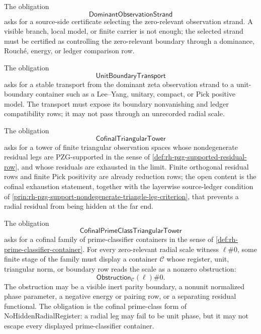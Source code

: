 \begin{definition}
\label{def:rh-dominant-observation-strand-obligation}
The obligation
$$
\mathsf{DominantObservationStrand}
$$
asks for a source-side certificate selecting the zero-relevant
observation strand. A visible branch, local model, or finite carrier is
not enough; the selected strand must be certified as controlling the
zero-relevant boundary through a dominance, Rouch\'e, energy, or ledger
comparison row.
\end{definition}

\begin{definition}
\label{def:rh-unit-boundary-transport-obligation}
The obligation
$$
\mathsf{UnitBoundaryTransport}
$$
asks for a stable transport from the dominant zeta observation strand to
a unit-boundary container such as a Lee--Yang, unitary, compact, or Pick
positive model. The transport must expose its boundary nonvanishing and
ledger compatibility rows; it may not pass through an unrecorded radial
scale.
\end{definition}

\begin{definition}
\label{def:rh-cofinal-triangular-tower-obligation}
The obligation
$$
\mathsf{CofinalTriangularTower}
$$
asks for a tower of finite triangular observation spaces whose
nondegenerate residual legs are PZG-supported in the sense of
\autoref{def:rh-pzg-supported-residual-row}, and whose residuals are
exhausted in the limit. Finite orthogonal residual rows and finite Pick
positivity are already reduction rows; the open content is the cofinal
exhaustion statement, together with the layerwise source-ledger condition
of \autoref{prin:rh-pzg-support-nondegenerate-triangle-leg-criterion},
that prevents a radial residual from being hidden at the far end.
\end{definition}

\begin{definition}
\label{def:rh-cofinal-prime-class-triangular-tower-obligation}
The obligation
$$
\mathsf{CofinalPrimeClassTriangularTower}
$$
asks for a cofinal family of prime-classifier containers in the sense of
\autoref{def:rh-prime-classifier-container}. For every zero-relevant
radial scale witness $\ell\#0$, some finite stage of the family must
display a container $\mathcal C$ whose register, unit, triangular norm,
or boundary row reads the scale as a nonzero obstruction:
$$
\mathsf{Obstruction}_{\mathcal C}(\ell)\#0.
$$
The obstruction may be a visible inert parity boundary, a nonunit
normalized phase parameter, a negative energy or pairing row, or a
separating residual functional. The obligation is the cofinal
prime-class form of NoHiddenRadialRegister: a radial leg may fail to be
unit phase, but it may not escape every displayed prime-classifier
container.
\end{definition}

